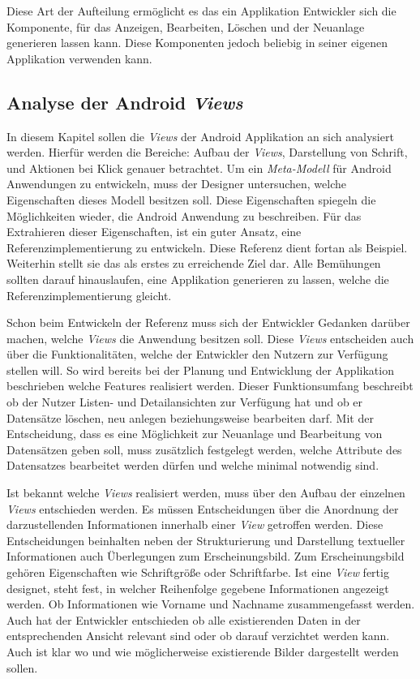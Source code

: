 Diese Art der Aufteilung ermöglicht es das ein Applikation Entwickler sich die Komponente, für das Anzeigen, Bearbeiten, Löschen und der Neuanlage generieren lassen kann. Diese Komponenten jedoch beliebig in seiner eigenen Applikation verwenden kann.


\subsection{Analyse der Android \textit{Views}}
In diesem Kapitel sollen die \textit{Views} der Android Applikation an sich analysiert werden. Hierfür werden die Bereiche: Aufbau der \textit{Views}, Darstellung von Schrift, und Aktionen bei Klick genauer betrachtet. Um ein \textit{Meta-Modell} für Android Anwendungen zu entwickeln, muss der Designer untersuchen, welche Eigenschaften dieses Modell besitzen soll. Diese Eigenschaften spiegeln die Möglichkeiten wieder, die Android Anwendung zu beschreiben. Für das Extrahieren dieser Eigenschaften, ist ein guter Ansatz, eine Referenzimplementierung zu entwickeln. Diese Referenz dient fortan als Beispiel. Weiterhin stellt sie das als erstes zu erreichende Ziel dar. Alle Bemühungen sollten darauf hinauslaufen, eine Applikation generieren zu lassen, welche die Referenzimplementierung gleicht.

Schon beim Entwickeln der Referenz muss sich der Entwickler Gedanken darüber machen, welche \textit{Views} die Anwendung besitzen soll. Diese \textit{Views} entscheiden auch über die Funktionalitäten, welche der Entwickler den Nutzern zur Verfügung stellen will. So wird bereits bei der Planung und Entwicklung der Applikation beschrieben welche Features realisiert werden. Dieser Funktionsumfang beschreibt ob der Nutzer Listen- und Detailansichten zur Verfügung hat und ob er Datensätze löschen, neu anlegen beziehungsweise bearbeiten darf. Mit der Entscheidung, dass es eine Möglichkeit zur Neuanlage und Bearbeitung von Datensätzen geben soll, muss zusätzlich festgelegt werden, welche Attribute des Datensatzes bearbeitet werden dürfen und welche minimal notwendig sind.

Ist bekannt welche \textit{Views} realisiert werden, muss über den Aufbau der einzelnen \textit{Views} entschieden werden. Es müssen Entscheidungen über die Anordnung der darzustellenden Informationen innerhalb einer \textit{View} getroffen werden. Diese Entscheidungen beinhalten neben der Strukturierung und Darstellung textueller Informationen auch Überlegungen zum Erscheinungsbild. Zum Erscheinungsbild gehören Eigenschaften wie Schriftgröße oder Schriftfarbe. Ist eine \textit{View} fertig designet, steht fest, in welcher Reihenfolge gegebene Informationen angezeigt werden. Ob Informationen wie Vorname und Nachname zusammengefasst werden. Auch hat der Entwickler entschieden ob alle existierenden Daten in der entsprechenden Ansicht relevant sind oder ob darauf verzichtet werden kann.  Auch ist klar wo und wie möglicherweise existierende Bilder dargestellt werden sollen.

